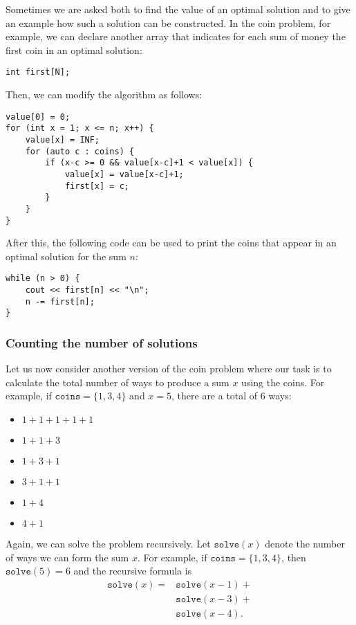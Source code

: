 Sometimes we are asked both to find the value
of an optimal solution and to give
an example how such a solution can be constructed.
In the coin problem, for example,
we can declare another array
that indicates for
each sum of money the first coin 
in an optimal solution:
\begin{lstlisting}
int first[N];
\end{lstlisting}
Then, we can modify the algorithm as follows:
\begin{lstlisting}
value[0] = 0;
for (int x = 1; x <= n; x++) {
    value[x] = INF;
    for (auto c : coins) {
        if (x-c >= 0 && value[x-c]+1 < value[x]) {
            value[x] = value[x-c]+1;
            first[x] = c;
        }
    }
}
\end{lstlisting}
After this, the following code can be used to
print the coins that appear in an optimal solution for
the sum $n$:
\begin{lstlisting}
while (n > 0) {
    cout << first[n] << "\n";
    n -= first[n];
}
\end{lstlisting}

\subsubsection{Counting the number of solutions}

Let us now consider another version
of the coin problem where our task is to
calculate the total number of ways
to produce a sum $x$ using the coins.
For example, if $\texttt{coins}=\{1,3,4\}$ and
$x=5$, there are a total of 6 ways:

\begin{multicols}{2}
\begin{itemize}
\item $1+1+1+1+1$
\item $1+1+3$
\item $1+3+1$
\item $3+1+1$
\item $1+4$
\item $4+1$
\end{itemize}
\end{multicols}

Again, we can solve the problem recursively.
Let $\texttt{solve}(x)$ denote the number of ways
we can form the sum $x$.
For example, if $\texttt{coins}=\{1,3,4\}$,
then $\texttt{solve}(5)=6$ and the recursive formula is
\begin{equation*}
\begin{split}
\texttt{solve}(x) = & \texttt{solve}(x-1) + \\
                    & \texttt{solve}(x-3) + \\
                    & \texttt{solve}(x-4)  .
\end{split}
\end{equation*}


